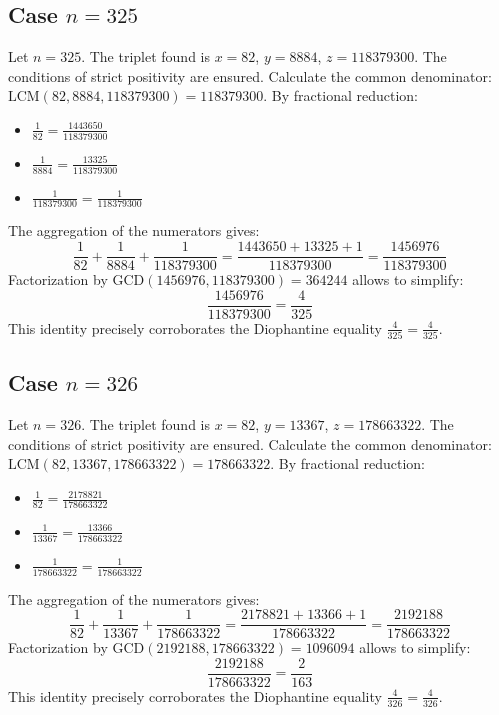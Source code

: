 \documentclass[11pt,a4paper]{article}
\begin{document}
\subsection{Case $n = 325$}
Let $n = 325$. The triplet found is $x = 82$, $y = 8884$, $z = 118379300$.
The conditions of strict positivity are ensured.
Calculate the common denominator: $\text{LCM}(82, 8884, 118379300) = 118379300$.
By fractional reduction:
\begin{itemize}
    \item $\frac{1}{82} = \frac{1443650}{118379300}$
    \item $\frac{1}{8884} = \frac{13325}{118379300}$
    \item $\frac{1}{118379300} = \frac{1}{118379300}$
\end{itemize}
The aggregation of the numerators gives:
$$ \frac{1}{82} + \frac{1}{8884} + \frac{1}{118379300} = \frac{1443650 + 13325 + 1}{118379300} = \frac{1456976}{118379300} $$
Factorization by $\text{GCD}(1456976, 118379300) = 364244$ allows to simplify:
$$ \frac{1456976}{118379300} = \frac{4}{325} $$
This identity precisely corroborates the Diophantine equality $\frac{4}{325} = \frac{4}{325}$.

\subsection{Case $n = 326$}
Let $n = 326$. The triplet found is $x = 82$, $y = 13367$, $z = 178663322$.
The conditions of strict positivity are ensured.
Calculate the common denominator: $\text{LCM}(82, 13367, 178663322) = 178663322$.
By fractional reduction:
\begin{itemize}
    \item $\frac{1}{82} = \frac{2178821}{178663322}$
    \item $\frac{1}{13367} = \frac{13366}{178663322}$
    \item $\frac{1}{178663322} = \frac{1}{178663322}$
\end{itemize}
The aggregation of the numerators gives:
$$ \frac{1}{82} + \frac{1}{13367} + \frac{1}{178663322} = \frac{2178821 + 13366 + 1}{178663322} = \frac{2192188}{178663322} $$
Factorization by $\text{GCD}(2192188, 178663322) = 1096094$ allows to simplify:
$$ \frac{2192188}{178663322} = \frac{2}{163} $$
This identity precisely corroborates the Diophantine equality $\frac{4}{326} = \frac{4}{326}$.
\end{document}
